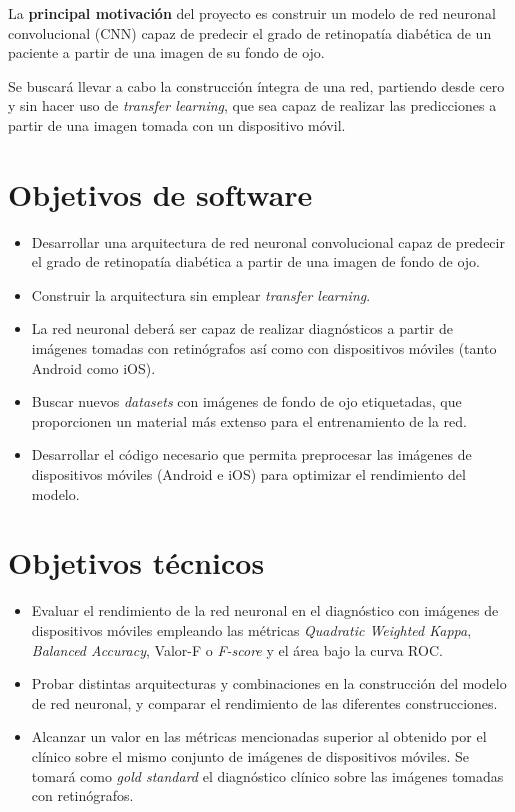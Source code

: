 
La \textbf{principal motivación} del proyecto es construir un modelo de red neuronal convolucional (CNN) capaz de predecir el grado de retinopatía diabética de un paciente a partir de una imagen de su fondo de ojo.

Se buscará llevar a cabo la construcción íntegra de una red, partiendo desde cero y sin hacer uso de \textit{transfer learning}, que sea capaz de realizar las predicciones a partir de una imagen tomada con un dispositivo móvil.

\section{Objetivos de software}
\begin{itemize}[itemsep=0.25em]
    \item Desarrollar una arquitectura de red neuronal convolucional capaz de predecir el grado de retinopatía diabética a partir de una imagen de fondo de ojo.
    \item Construir la arquitectura sin emplear \textit{transfer learning}.
    \item La red neuronal deberá ser capaz de realizar diagnósticos a partir de imágenes tomadas con retinógrafos así como con dispositivos móviles (tanto Android como iOS).
    \item Buscar nuevos \textit{datasets} con imágenes de fondo de ojo etiquetadas, que proporcionen un material más extenso para el entrenamiento de la red.
    \item Desarrollar el código necesario que permita preprocesar las imágenes de dispositivos móviles (Android e iOS) para optimizar el rendimiento del modelo.
\end{itemize}

\section{Objetivos técnicos}
\begin{itemize}[itemsep=0.25em]
    \item Evaluar el rendimiento de la red neuronal en el diagnóstico con imágenes de dispositivos móviles empleando las métricas \textit{Quadratic Weighted Kappa}, \textit{Balanced Accuracy}, Valor-F o \textit{F-score} y el área bajo la curva ROC.
    \item Probar distintas arquitecturas y combinaciones en la construcción del modelo de red neuronal, y comparar el rendimiento de las diferentes construcciones. 
    \item Alcanzar un valor en las métricas mencionadas superior al obtenido por el clínico sobre el mismo conjunto de imágenes de dispositivos móviles. Se tomará como \textit{gold standard} el diagnóstico clínico sobre las imágenes tomadas con retinógrafos.
\end{itemize}

